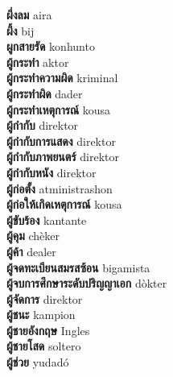 \textbf{ ผึ่งลม  } aira \\
\textbf{ ผึ้ง  } bij \\
\textbf{ ผูกสายรัด  } konhunto \\
\textbf{ ผู้กระทำ  } aktor \\
\textbf{ ผู้กระทำความผิด  } kriminal \\
\textbf{ ผู้กระทำผิด  } dader \\
\textbf{ ผู้กระทำเหตุการณ์  } kousa \\
\textbf{ ผู้กำกับ  } direktor \\
\textbf{ ผู้กำกับการแสดง  } direktor \\
\textbf{ ผู้กำกับภาพยนตร์  } direktor \\
\textbf{ ผู้กำกับหนัง  } direktor \\
\textbf{ ผู้ก่อตั้ง  } atministrashon \\
\textbf{ ผู้ก่อให้เกิดเหตุการณ์  } kousa \\
\textbf{ ผู้ขับร้อง  } kantante \\
\textbf{ ผู้คุม  } chèker \\
\textbf{ ผู้ค้า  } dealer \\
\textbf{ ผู้จดทะเบียนสมรสซ้อน  } bigamista \\
\textbf{ ผู้จบการศึกษาระดับปริญญาเอก  } dòkter \\
\textbf{ ผู้จัดการ  } direktor \\
\textbf{ ผู้ชนะ  } kampion \\
\textbf{ ผู้ชายอังกฤษ  } Ingles \\
\textbf{ ผู้ชายโสด  } soltero \\
\textbf{ ผู้ช่วย  } yudadó \\

